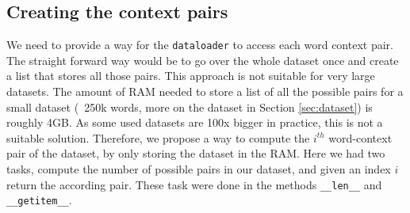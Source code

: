 \subsection{Creating the context pairs}
We need to provide a way for the \texttt{dataloader} to access each word context pair. The straight forward way would be to go over the whole dataset once and create a list that stores all those pairs. This approach is not suitable for very large datasets. The amount of RAM needed to store a list of all the possible pairs for a small dataset (~250k words, more on the dataset in Section \ref{sec:dataset}) is roughly 4GB. As some used datasets are 100x bigger in practice, this is not a suitable solution. Therefore, we propose a way to compute the $i^{th}$ word-context pair of the dataset, by only storing the dataset in the RAM. Here we had two tasks, compute the number of possible pairs in our dataset, and given an index $i$ return the according pair. These task were done in the methods \texttt{\_\_len\_\_} and \texttt{\_\_getitem\_\_}.

